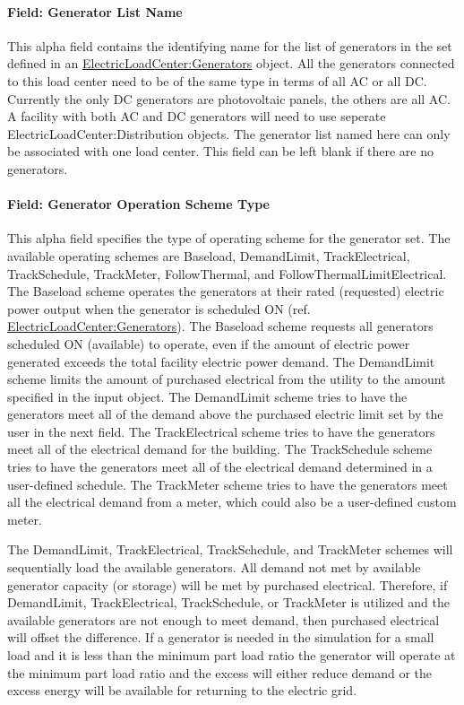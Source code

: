 \paragraph{Field: Generator List Name}\label{field-generator-list-name}

This alpha field contains the identifying name for the list of generators in the set defined in an \hyperref[electricloadcentergenerators]{ElectricLoadCenter:Generators} object. All the generators connected to this load center need to be of the same type in terms of all AC or all DC. Currently the only DC generators are photovoltaic panels, the others are all AC. A facility with both AC and DC generators will need to use seperate ElectricLoadCenter:Distribution objects. The generator list named here can only be associated with one load center. This field can be left blank if there are no generators.

\paragraph{Field: Generator Operation Scheme Type}\label{field-generator-operation-scheme-type}

This alpha field specifies the type of operating scheme for the generator set. The available operating schemes are Baseload, DemandLimit, TrackElectrical, TrackSchedule, TrackMeter, FollowThermal, and FollowThermalLimitElectrical. The Baseload scheme operates the generators at their rated (requested) electric power output when the generator is scheduled ON (ref. \hyperref[electricloadcentergenerators]{ElectricLoadCenter:Generators}). The Baseload scheme requests all generators scheduled ON (available) to operate, even if the amount of electric power generated exceeds the total facility electric power demand. The DemandLimit scheme limits the amount of purchased electrical from the utility to the amount specified in the input object. The DemandLimit scheme tries to have the generators meet all of the demand above the purchased electric limit set by the user in the next field. The TrackElectrical scheme tries to have the generators meet all of the electrical demand for the building. The TrackSchedule scheme tries to have the generators meet all of the electrical demand determined in a user-defined schedule. The TrackMeter scheme tries to have the generators meet all the electrical demand from a meter, which could also be a user-defined custom meter.

The DemandLimit, TrackElectrical, TrackSchedule, and TrackMeter schemes will sequentially load the available generators. All demand not met by available generator capacity (or storage) will be met by purchased electrical. Therefore, if DemandLimit, TrackElectrical, TrackSchedule, or TrackMeter is utilized and the available generators are not enough to meet demand, then purchased electrical will offset the difference. If a generator is needed in the simulation for a small load and it is less than the minimum part load ratio the generator will operate at the minimum part load ratio and the excess will either reduce demand or the excess energy will be available for returning to the electric grid.

